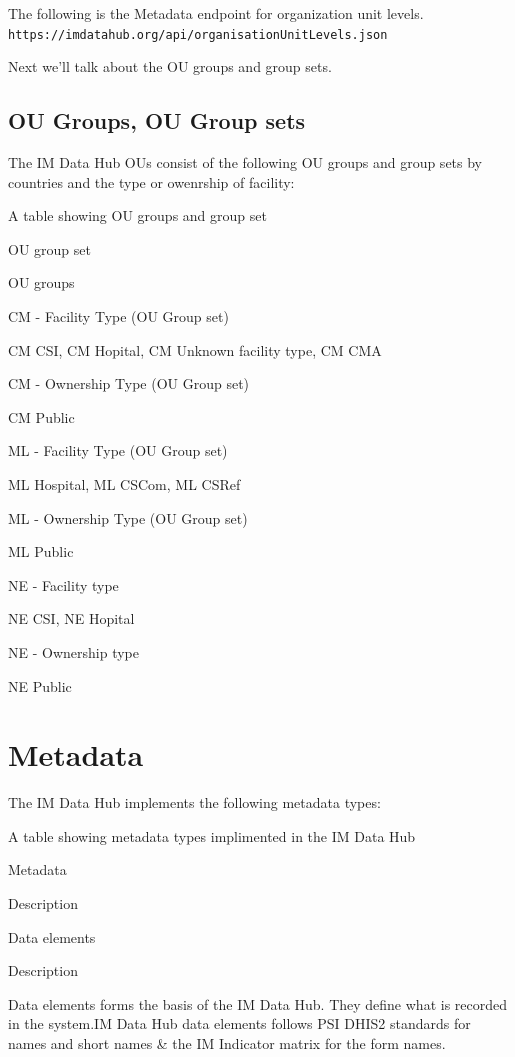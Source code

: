 \documentclass[]{book}
\begin{document}
The following is the Metadata endpoint for organization unit levels.
\texttt{https://imdatahub.org/api/organisationUnitLevels.json}

Next we'll talk about the OU groups and group sets.

\hypertarget{ou-groups-ou-group-sets}{%
\subsection{OU Groups, OU Group sets}\label{ou-groups-ou-group-sets}}

The IM Data Hub OUs consist of the following OU groups and group sets by countries and the type or owenrship of facility:

\label{tab:unnamed-chunk-13}A table showing OU groups and group set

OU group set

OU groups

CM - Facility Type (OU Group set)

CM CSI, CM Hopital, CM Unknown facility type, CM CMA

CM - Ownership Type (OU Group set)

CM Public

ML - Facility Type (OU Group set)

ML Hospital, ML CSCom, ML CSRef

ML - Ownership Type (OU Group set)

ML Public

NE - Facility type

NE CSI, NE Hopital

NE - Ownership type

NE Public

\hypertarget{metadata}{%
\section{Metadata}\label{metadata}}

The IM Data Hub implements the following metadata types:

\label{tab:unnamed-chunk-14}A table showing metadata types implimented in the IM Data Hub

Metadata

Description

Data elements

Description

Data elements forms the basis of the IM Data Hub. They define what is recorded in the system.IM Data Hub data elements follows PSI DHIS2 standards for names and short names \& the IM Indicator matrix for the form names.
\end{document}
